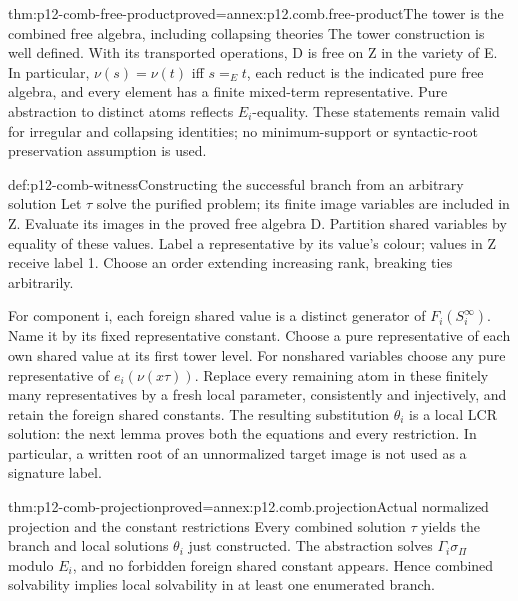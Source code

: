\begin{hblemma}{thm:p12-comb-free-product}{proved=annex:p12.comb.free-product}{The tower is the combined free algebra, including collapsing theories}
The tower construction is well defined. With its transported operations,
D is free on Z in the variety of E. In particular,
\(\nu(s)=\nu(t)\) iff \(s=_Et\), each reduct is the indicated pure
free algebra, and every element has a finite mixed-term representative.
Pure abstraction to distinct atoms reflects \(E_i\)-equality. These
statements remain valid for irregular and collapsing identities; no
minimum-support or syntactic-root preservation assumption is used.
\end{hblemma}

\begin{hbmethod}{def:p12-comb-witness}{Constructing the successful branch from an arbitrary solution}
Let \(\tau\) solve the purified problem; its finite image variables
are included in Z. Evaluate its images in the proved free algebra D.
Partition shared variables by equality of these values. Label a
representative by its value's colour; values in Z receive label 1.
Choose an order extending increasing rank, breaking ties arbitrarily.

For component i, each foreign shared value is a distinct generator
of \(F_i(S_i^\infty)\). Name it by its fixed representative constant.
Choose a pure representative of each own shared value at its first
tower level. For nonshared variables choose any pure representative
of \(e_i(\nu(x\tau))\). Replace every remaining atom in these finitely
many representatives by a fresh local parameter, consistently and
injectively, and retain the foreign shared constants. The resulting
substitution \(\theta_i\) is a local LCR solution: the next lemma proves
both the equations and every restriction. In particular, a written
root of an unnormalized target image is not used as a signature label.
\end{hbmethod}

\begin{hblemma}{thm:p12-comb-projection}{proved=annex:p12.comb.projection}{Actual normalized projection and the constant restrictions}
Every combined solution \(\tau\) yields the branch and local solutions
\(\theta_i\) just constructed. The abstraction solves
\(\Gamma_i\sigma_\Pi\) modulo \(E_i\), and no forbidden foreign shared
constant appears. Hence combined solvability implies local solvability
in at least one enumerated branch.
\end{hblemma}


